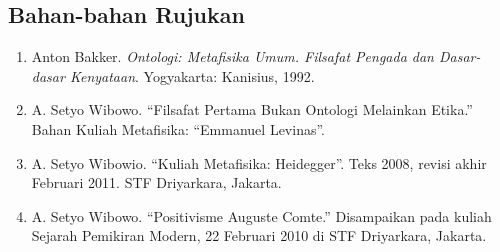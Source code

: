 \documentclass[11pt,twoside,a5paper,openany]{memoir}
\def\tightlist{}
\begin{document}
\hypertarget{bahan-bahan-rujukan-3}{%
\subsection{Bahan-bahan Rujukan}\label{bahan-bahan-rujukan-3}}

\begin{enumerate}
\def\labelenumi{\arabic{enumi}.}
\tightlist
\item
  Anton Bakker. \emph{Ontologi: Metafisika Umum. Filsafat Pengada dan
  Dasar-dasar Kenyataan}. Yogyakarta: Kanisius, 1992.
\item
  A. Setyo Wibowo. ``Filsafat Pertama Bukan Ontologi Melainkan Etika.''
  Bahan Kuliah Metafisika: ``Emmanuel Levinas''.
\item
  A. Setyo Wibowio. ``Kuliah Metafisika: Heidegger''. Teks 2008, revisi
  akhir Februari 2011. STF Driyarkara, Jakarta.
\item
  A. Setyo Wibowo. ``Positivisme Auguste Comte.'' Disampaikan pada
  kuliah Sejarah Pemikiran Modern, 22 Februari 2010 di STF Driyarkara,
  Jakarta.
\end{enumerate}
\end{document}

